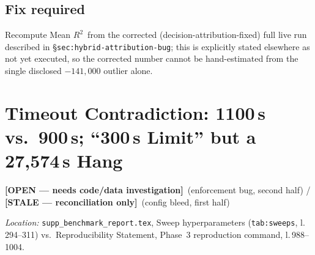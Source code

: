 \documentclass[11pt]{article}
\newcommand{\rtwo}{$R^2$}
\newcommand{\open}{\textcolor{red!60!black}{\textbf{[OPEN --- needs code/data investigation]}}}
\newcommand{\stale}{\textcolor{orange!80!black}{\textbf{[STALE --- reconciliation only]}}}
\newcommand{\loc}[1]{\textit{Location:} #1\par}
\begin{document}
\subsection*{Fix required}
Recompute Mean \rtwo\ from the corrected (decision-attribution-fixed) full
live run described in \S\texttt{sec:hybrid-attribution-bug}; this is
explicitly stated elsewhere as not yet executed, so the corrected number
cannot be hand-estimated from the single disclosed $-141{,}000$ outlier
alone.

\section{Timeout Contradiction: 1100\,s vs.\ 900\,s; ``300\,s Limit'' but a 27{,}574\,s Hang}
\label{issue:10}
\open\ (enforcement bug, second half) / \stale\ (config bleed, first half)

\loc{\texttt{supp\_benchmark\_report.tex}, Sweep hyperparameters
(\texttt{tab:sweeps}, l.\,294--311) vs.\ Reproducibility Statement, Phase~3
reproduction command, l.\,988--1004.}
\end{document}
